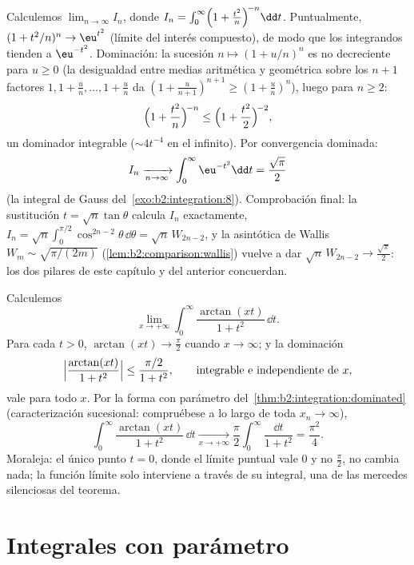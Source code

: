\begin{example}\label{ex:b2:integration:wallislimit}
Calculemos $\displaystyle\lim_{n\to\infty} I_n$, donde $I_n =
\int_0^\infty \Bigl(1 + \frac{t^2}{n}\Bigr)^{\!-n}\dd t$.
Puntualmente, $(1 + t^2/n)^n \to \eu^{t^2}$ (límite del interés
compuesto), de modo que los integrandos tienden a $\eu^{-t^2}$.
Dominación: la sucesión $n \mapsto (1 + u/n)^n$ es no decreciente
para $u \geq 0$ (la desigualdad entre medias aritmética y geométrica
sobre los $n + 1$ factores $1, 1 + \frac un, \dots, 1 + \frac un$ da
$(1 + \frac u{n+1})^{n+1} \geq (1 + \frac un)^n$), luego para $n
\geq 2$:
\[
\Bigl(1 + \frac{t^2}{n}\Bigr)^{\!-n}
\leq \Bigl(1 + \frac{t^2}{2}\Bigr)^{\!-2},
\]
un dominador integrable ($\sim 4t^{-4}$ en el infinito). Por
convergencia dominada:
\[
I_n \xrightarrow[n\to\infty]{} \int_0^\infty \eu^{-t^2}\dd t
= \frac{\sqrt\pi}{2}
\]
(la integral de Gauss del~\cref{exo:b2:integration:8}).
Comprobación final: la sustitución $t = \sqrt n\tan\theta$ calcula
$I_n$ exactamente, $I_n = \sqrt
n\int_0^{\pi/2}\cos^{2n-2}\theta\,\dd\theta = \sqrt n\,W_{2n-2}$, y
la asintótica de Wallis $W_m \sim \sqrt{\pi/(2m)}$
(\cref{lem:b2:comparison:wallis}) vuelve a dar $\sqrt n\,W_{2n-2}
\to \frac{\sqrt\pi}2$: los dos pilares de este capítulo y del
anterior concuerdan.
\end{example}

\begin{example}
\label{ex:b2:integration:arctanlimit}
Calculemos
\[
\lim_{x\to+\infty}\int_0^\infty
\frac{\arctan(xt)}{1+t^2}\,\dd t .
\]
Para cada $t > 0$, $\arctan(xt) \to \frac\pi2$ cuando $x \to
\infty$; y la dominación
\[
\Bigl|\frac{\arctan(xt)}{1+t^2}\Bigr|
\leq \frac{\pi/2}{1+t^2},
\qquad\text{integrable e independiente de } x,
\]
vale para todo $x$. Por la forma con parámetro  del~\cref{thm:b2:integration:dominated} (caracterización sucesional:
compruébese a lo largo de toda $x_n \to \infty$),
\[
\int_0^\infty\frac{\arctan(xt)}{1+t^2}\,\dd t
\xrightarrow[x\to+\infty]{}
\frac\pi2\int_0^\infty\frac{\dd t}{1+t^2}
= \frac{\pi^2}{4} .
\]
Moraleja: el único punto $t = 0$, donde el límite puntual vale $0$ y
no $\frac\pi2$, no cambia nada; la función límite solo interviene a
través de su integral, una de las mercedes silenciosas del teorema.
\end{example}

\section{Integrales con parámetro}

